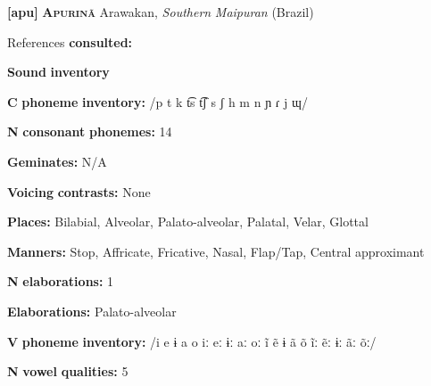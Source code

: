 \documentclass[output=paper]{langsci/langscibook}
\begin{document}
\begin{styleBody}
\textbf{[apu]}   \textbf{\textsc{Apurinã}}  Arawakan, \textit{Southern} \textit{Maipuran} (Brazil)
\end{styleBody}

\begin{styleBody}
References \textbf{consulted:} \citet{Facundes2000}
\end{styleBody}

\begin{styleBody}
\textbf{Sound} \textbf{inventory}
\end{styleBody}

\begin{styleBody}
\textbf{C} \textbf{phoneme} \textbf{inventory:} /p t k t͡s t͡ʃ s ʃ h m n ɲ ɾ j ɰ/
\end{styleBody}

\begin{styleBody}
\textbf{N} \textbf{consonant} \textbf{phonemes:} 14
\end{styleBody}

\begin{styleBody}
\textbf{Geminates:} N/A
\end{styleBody}

\begin{styleBody}
\textbf{Voicing} \textbf{contrasts:} None
\end{styleBody}

\begin{styleBody}
\textbf{Places:} Bilabial, Alveolar, Palato-alveolar, Palatal, Velar, Glottal
\end{styleBody}

\begin{styleBody}
\textbf{Manners:} Stop, Affricate, Fricative, Nasal, Flap/Tap, Central approximant
\end{styleBody}

\begin{styleBody}
\textbf{N} \textbf{elaborations:} 1
\end{styleBody}

\begin{styleBody}
\textbf{Elaborations:} Palato-alveolar
\end{styleBody}

\begin{styleBody}
\textbf{V} \textbf{phoneme} \textbf{inventory:} /i e ɨ a o iː eː ɨː aː oː ĩ ẽ ɨ ã õ ĩː ẽː ɨː ãː õː/
\end{styleBody}

\begin{styleBody}
\textbf{N} \textbf{vowel} \textbf{qualities:} 5
\end{styleBody}
\end{document}
